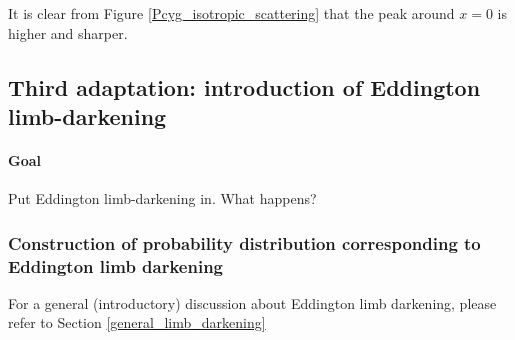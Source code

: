 \documentclass[../main/main.tex]{subfiles}
\begin{document}
It is clear from Figure \ref{Pcyg_isotropic_scattering} that the peak around $x=0$ is higher and sharper. \\
\noindent{}

\newpage
\subsection{Third adaptation: introduction of Eddington limb-darkening}
\label{Eddington_limb_darkening_adaptation}

\paragraph{Goal} Put Eddington limb-darkening in. What happens? 

\subsubsection{Construction of probability distribution corresponding to Eddington limb darkening}
For a general (introductory) discussion about Eddington limb darkening, please refer to Section \ref{general_limb_darkening}
\end{document}
